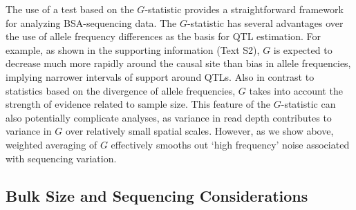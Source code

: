 The use of a test based on the $G$-statistic provides a straightforward  framework for analyzing BSA-sequencing data.  The $G$-statistic has several advantages over the use of allele frequency differences as the basis for QTL estimation. For example, as shown in the supporting information (Text S2), $G$ is expected to decrease much more rapidly around the causal site than bias in allele frequencies, implying narrower intervals of support around QTLs.  Also in contrast to statistics based on the divergence of allele frequencies, $G$ takes into account the strength of evidence related to sample size. This feature of the $G$-statistic can also potentially complicate analyses, as variance in read depth contributes to variance in $G$ over relatively small spatial scales. However, as we show above, weighted averaging of $G$ effectively smooths out `high frequency' noise associated with sequencing variation.


\subsection{Bulk Size and Sequencing Considerations}

